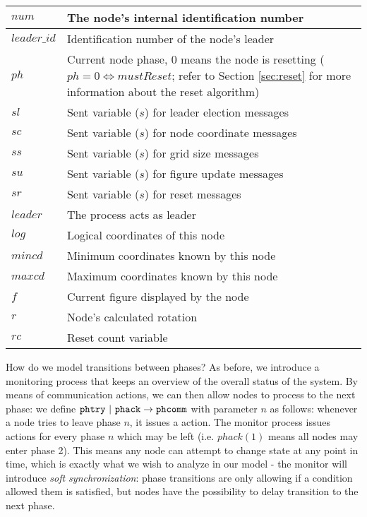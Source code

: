 \begin{tabularx}{\textwidth}{|l|X|}
\hline
$num$        & The node's internal identification number \\
\hline
$leader\_id$ & Identification number of the node's leader \\
\hline
$ph$         & Current node phase, $0$ means the node is resetting ($ph = 0 \Leftrightarrow mustReset$; refer to Section \ref{sec:reset} for more information about the reset algorithm) \\
\hline
$sl$         & Sent variable ($s$) for leader election messages \\
\hline
$sc$         & Sent variable ($s$) for node coordinate messages \\
\hline
$ss$         & Sent variable ($s$) for grid size messages \\
\hline
$su$         & Sent variable ($s$) for figure update messages \\
\hline
$sr$         & Sent variable ($s$) for reset messages \\
\hline
$leader$     & The process acts as leader \\
\hline
$log$        & Logical coordinates of this node \\
\hline
$mincd$      & Minimum coordinates known by this node \\
\hline
$maxcd$      & Maximum coordinates known by this node \\
\hline
$f$          & Current figure displayed by the node \\
\hline
$r$          & Node's calculated rotation \\
\hline
$rc$         & Reset count variable \\
\hline
\end{tabularx}

How do we model transitions between phases? As before, we introduce a monitoring process that keeps an overview of the overall status of the system. By means of communication actions, we can then allow nodes to process to the next phase: we define $\texttt{phtry} ~|~ \texttt{phack} \rightarrow \texttt{phcomm}$ with parameter $n$ as follows: whenever a node tries to leave phase $n$, it issues a  action. The monitor process issues  actions for every phase $n$ which may be left (i.e. $phack(1)$ means all nodes may enter phase 2). This means any node can attempt to change state at any point in time, which is exactly what we wish to analyze in our model - the monitor will introduce \emph{soft synchronization}: phase transitions are only allowing if a condition allowed them is satisfied, but nodes have the possibility to delay transition to the next phase.

